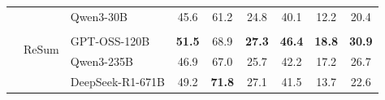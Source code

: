 \begin{table}[!t]
{\begin{tabular}{lll|cc|cc|cc}
        &  \multirow{5}{*}{ReSum} & Qwen3-30B & 45.6 & 61.2 & 24.8 & 40.1 & 12.2 & 20.4 \\
        & & \cellcolor{ours}{ReSumTool-30B} & \cellcolor{ours}{47.3} & \cellcolor{ours}{63.1} & \cellcolor{ours}{24.1} & \cellcolor{ours}{42.6} & \cellcolor{ours}{16.0} & \cellcolor{ours}{25.4} \\ 
        & & GPT-OSS-120B & \textbf{51.5} & 68.9 & \textbf{27.3} & \textbf{46.4} & \textbf{18.8} & \textbf{30.9} \\ 
        & & Qwen3-235B & 46.9 & 67.0 & 25.7 & 42.2 & 17.2 & 26.7 \\ 
        & & DeepSeek-R1-671B & 49.2 & \textbf{71.8} & 27.1 & 41.5 & 13.7 & 22.6 \\ 
       \bottomrule
    \end{tabular}
    }
    \label{tab:training_free_performance}
\end{table}


